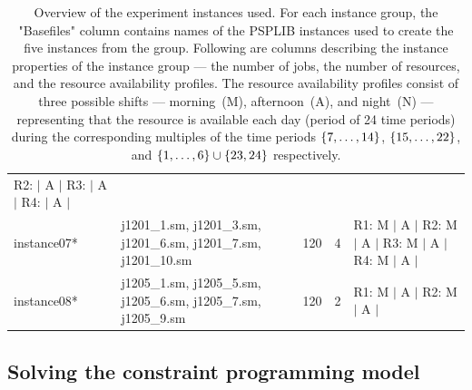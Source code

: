 \begin{table}[p]
\begin{tabularx}{\textwidth}{lXccX}
                      R2: \phantom{M} $|$ A $|$ \newline
                      R3: \phantom{M} $|$ A $|$ \newline
                      R4: \phantom{M} $|$ A $|$
                    \\
                    \cmidrule[0.01em](lr){1-5}
        instance07* & j1201\_1.sm, j1201\_3.sm, j1201\_6.sm, j1201\_7.sm, j1201\_10.sm
                    & 120
                    & 4 
                    & R1: M $|$ A $|$ \newline
                      R2: M $|$ A $|$ \newline
                      R3: M $|$ A $|$ \newline
                      R4: M $|$ A $|$
                    \\
                    \cmidrule[0.01em](lr){1-5}
        instance08* & j1205\_1.sm, j1205\_5.sm, j1205\_6.sm, j1205\_7.sm, j1205\_9.sm
                    & 120
                    & 2 
                    & R1: M $|$ A $|$ \newline
                      R2: M $|$ A $|$
                    \\
        \bottomrule
    \end{tabularx}
    \caption{
        Overview of the experiment instances used.
        For each instance group,
        the "Basefiles" column contains names of the PSPLIB instances
        used to create the five instances from the group.
        Following are columns describing the instance properties of the instance group ---
        the number of jobs, the number of resources, and the resource availability profiles.
        The resource availability profiles consist of three possible shifts ---
        morning~(M), afternoon~(A), and night~(N) ---
        representing that the resource is available each day (period of 24 time periods)
        during the corresponding multiples of the time periods
        $\{{7}, \dots, {14}\}$, $\{{15}, \dots, {22}\}$, and $\{{1}, \dots, {6}\} \cup \{23, 24\}$ respectively.
        }
    \label{tab:instances}
\end{table}

\subsection{Solving the constraint programming model} \label{subsec:numerical-experiments/setup/solving-cp-model}

